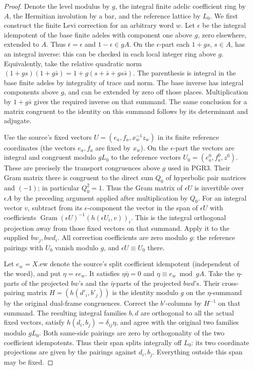 \begin{proof}
Denote the level modulus by \(g\), the integral finite adelic
coefficient ring by \(A\), the Hermitian involution by a bar, and
the reference lattice by \(L_0\). We first construct the finite Levi
correction for an arbitrary word \(w\). Let \(\epsilon\) be the
integral idempotent of the base finite adeles with component one
above \(g\), zero elsewhere, extended to \(A\). Thus
\(\bar\epsilon=\epsilon\) and \(1-\epsilon\in gA\). On the
\(\epsilon\)-part each \(1+gs\), \(s\in A\), has an integral
inverse: this can be checked in each local integer ring above \(g\).
Equivalently, take the relative quadratic norm
\((1+gs)(1+g\bar s)=1+g(s+\bar s+gs\bar s)\).
The parenthesis is integral in the base finite adeles by integrality
of trace and norm. The base inverse has integral components above
\(g\), and can be extended by zero off those places. Multiplication
by \(1+g\bar s\) gives the required inverse on that summand. The
same conclusion for a matrix congruent to the identity on this
summand follows by its determinant and adjugate.

Use the source's fixed vectors \(U=(e_a,f_a,x_w^{-1}z_w)\) in its
finite reference coordinates (the vectors \(e_a,f_a\) are fixed by
\(x_w\)). On the \(\epsilon\)-part the vectors are integral and
congruent modulo \(gL_0\) to the reference vectors
\(U_0=(e_a^0,f_a^0,z^0)\). These are precisely the transport
congruences above \(g\) used in PGR3. Their Gram matrix there is
congruent to the direct sum \(Q_0\) of hyperbolic pair matrices
and \((-1)\); in particular \(Q_0^2=1\). Thus the Gram matrix
of \(\epsilon U\) is invertible over \(\epsilon A\) by the preceding
argument applied after multiplication by \(Q_0\). For an integral
vector \(v\), subtract from its \(\epsilon\)-component the vector
in the span of \(\epsilon U\) with coefficients
\(\operatorname{Gram}(\epsilon U)^{-1}(h(\epsilon U_i,v))_i\).
This is the integral orthogonal projection away from those fixed
vectors on that summand. Apply it to the supplied \(bw_j,bwd_i\).
All correction coefficients are zero modulo \(g\): the reference
pairings with \(U_0\) vanish modulo \(g\), and
\(\epsilon U\equiv U_0\) there.

Let \(e_w=X.\mathrm{ew}\) denote the source's split coefficient
idempotent (independent of the word), and put \(\eta=\epsilon e_w\).
It satisfies \(\eta\bar\eta=0\) and \(\eta\equiv e_w\bmod gA\).
Take the \(\eta\)-parts of the projected \(bw\)'s and the
\(\bar\eta\)-parts of the projected \(bwd\)'s. Their cross-pairing
matrix \(H=(h(d'_i,b'_j))\) is the identity modulo \(g\) on the
\(\eta\)-summand by the original dual-frame congruences. Correct
the \(b'\)-columns by \(H^{-1}\) on that summand. The resulting
integral families \(b,d\) are orthogonal to all the actual fixed
vectors, satisfy \(h(d_i,b_j)=\delta_{ij}\eta\), and agree with
the original two families modulo \(gL_0\).
Both same-side pairings are zero by orthogonality of the two
coefficient idempotents. Thus their span splits integrally off
\(L_0\): its two coordinate projections are given by the pairings
against \(d_i,b_j\). Everything outside this span may be fixed.


\end{proof}
